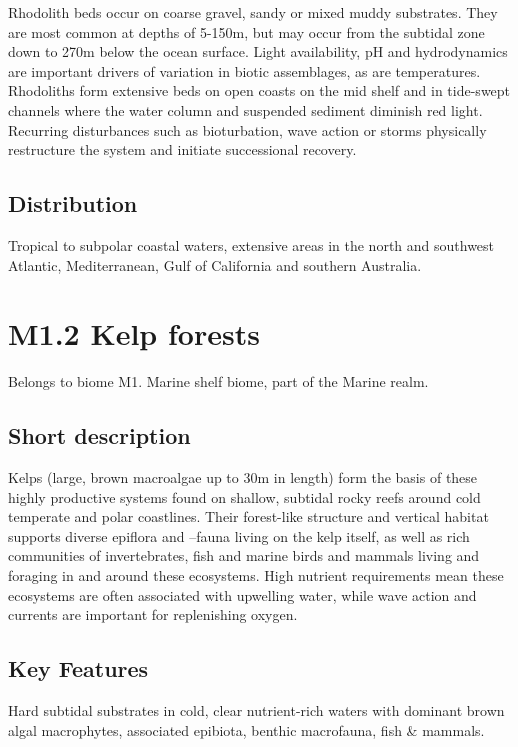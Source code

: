 \documentclass[
  letterpaper,
  DIV=11,
  numbers=noendperiod]{scrartcl}
\begin{document}
Rhodolith beds occur on coarse gravel, sandy or mixed muddy substrates.
They are most common at depths of 5-150m, but may occur from the
subtidal zone down to 270m below the ocean surface. Light availability,
pH and hydrodynamics are important drivers of variation in biotic
assemblages, as are temperatures. Rhodoliths form extensive beds on open
coasts on the mid shelf and in tide-swept channels where the water
column and suspended sediment diminish red light. Recurring disturbances
such as bioturbation, wave action or storms physically restructure the
system and initiate successional recovery.

\subsection{Distribution}\label{distribution-26}

Tropical to subpolar coastal waters, extensive areas in the north and
southwest Atlantic, Mediterranean, Gulf of California and southern
Australia.

\section{M1.2 Kelp forests}\label{m1.2-kelp-forests}

Belongs to biome M1. Marine shelf biome, part of the Marine realm.

\subsection{Short description}\label{short-description-27}

Kelps (large, brown macroalgae up to 30m in length) form the basis of
these highly productive systems found on shallow, subtidal rocky reefs
around cold temperate and polar coastlines. Their forest-like structure
and vertical habitat supports diverse epiflora and --fauna living on the
kelp itself, as well as rich communities of invertebrates, fish and
marine birds and mammals living and foraging in and around these
ecosystems. High nutrient requirements mean these ecosystems are often
associated with upwelling water, while wave action and currents are
important for replenishing oxygen.

\subsection{Key Features}\label{key-features-27}

Hard subtidal substrates in cold, clear nutrient-rich waters with
dominant brown algal macrophytes, associated epibiota, benthic
macrofauna, fish \& mammals.
\end{document}
